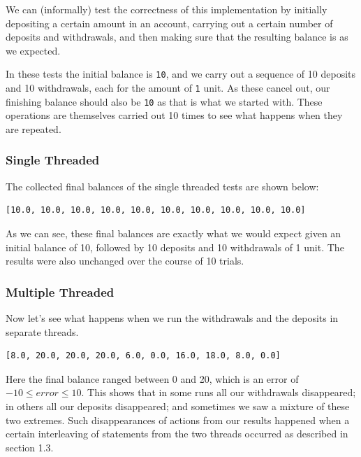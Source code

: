 \documentclass[a4paper,12pt]{kth-mag}
\begin{document}
We can (informally) test the correctness of this implementation by initially depositing a certain amount in an account, carrying out a certain number of deposits and withdrawals, and then making sure that the resulting balance is as we expected.

In these tests the initial balance is \texttt{10}, and we carry out a sequence of 10 deposits and 10 withdrawals, each for the amount of \texttt{1} unit. As these cancel out, our finishing balance should also be \texttt{10} as that is what we started with. These operations are themselves carried out 10 times to see what happens when they are repeated.

\subsubsection{Single Threaded}

The collected final balances of the single threaded tests are shown below:

\begin{listing}[H]
	\begin{verbatim}
[10.0, 10.0, 10.0, 10.0, 10.0, 10.0, 10.0, 10.0, 10.0, 10.0]
	\end{verbatim}
\end{listing}

As we can see, these final balances are exactly what we would expect given an initial balance of 10, followed by 10 deposits and 10 withdrawals of 1 unit. The results were also unchanged over the course of 10 trials.

\subsubsection{Multiple Threaded}

Now let's see what happens when we run the withdrawals and the deposits in separate threads. 

\begin{listing}[H]
	\begin{verbatim}
[8.0, 20.0, 20.0, 20.0, 6.0, 0.0, 16.0, 18.0, 8.0, 0.0]
	\end{verbatim}
\end{listing}

Here the final balance ranged between 0 and 20, which is an error of $-10 \leq error \leq 10$. This shows that in some runs all our withdrawals disappeared; in others all our deposits disappeared; and sometimes we saw a mixture of these two extremes. Such disappearances of actions from our results happened when a certain interleaving of statements from the two threads occurred as described in section 1.3.
\end{document}
